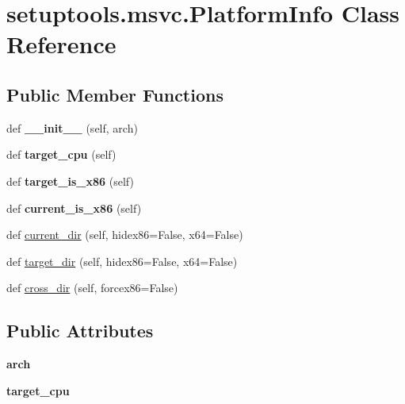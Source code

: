 \hypertarget{classsetuptools_1_1msvc_1_1_platform_info}{}\section{setuptools.\+msvc.\+Platform\+Info Class Reference}
\label{classsetuptools_1_1msvc_1_1_platform_info}
\subsection*{Public Member Functions}
\begin{DoxyCompactItemize}
\item 
\mbox{\label{classsetuptools_1_1msvc_1_1_platform_info_aa98d6a4ffa306e85dba513ac18612492}} 
def {\bfseries \+\_\+\+\_\+init\+\_\+\+\_\+} (self, arch)
\item 
\mbox{\label{classsetuptools_1_1msvc_1_1_platform_info_a2c7d1dc5add6f0b2494e161f364c4644}} 
def {\bfseries target\+\_\+cpu} (self)
\item 
\mbox{\label{classsetuptools_1_1msvc_1_1_platform_info_a33202c8f736ad183994d06b48b7afd6f}} 
def {\bfseries target\+\_\+is\+\_\+x86} (self)
\item 
\mbox{\label{classsetuptools_1_1msvc_1_1_platform_info_a09c58742017714dfae07c6604e3f837b}} 
def {\bfseries current\+\_\+is\+\_\+x86} (self)
\item 
def \hyperlink{classsetuptools_1_1msvc_1_1_platform_info_a5d8f69638b5c98cc654174f4c944d1ab}{current\+\_\+dir} (self, hidex86=False, x64=False)
\item 
def \hyperlink{classsetuptools_1_1msvc_1_1_platform_info_a8ff098933fbab72ab767191b392e486b}{target\+\_\+dir} (self, hidex86=False, x64=False)
\item 
def \hyperlink{classsetuptools_1_1msvc_1_1_platform_info_a9cd7bd8ff66ddc3b79fe7448c52f1504}{cross\+\_\+dir} (self, forcex86=False)
\end{DoxyCompactItemize}
\subsection*{Public Attributes}
\begin{DoxyCompactItemize}
\item 
\mbox{\label{classsetuptools_1_1msvc_1_1_platform_info_a35417db9c47564d7101f92145515092c}} 
{\bfseries arch}
\item 
\mbox{\label{classsetuptools_1_1msvc_1_1_platform_info_a5bcf4cada8bfe500f75146ebcbfc1759}} 
{\bfseries target\+\_\+cpu}
\end{DoxyCompactItemize}
